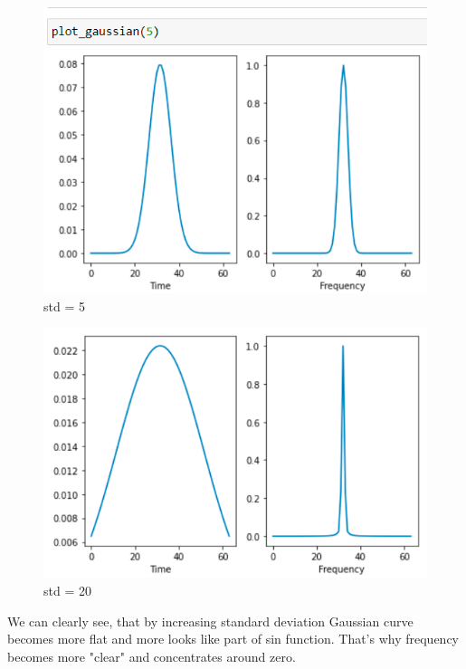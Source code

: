 \documentclass[a4paper]{article}
\begin{document}
        \begin{figure}[H]
            \centering
            \includegraphics[width=\textwidth]{img/p2_3.png}
            \caption{std = 5}
            \label{fig:part1_1_2}
        \end{figure}
        
        \begin{figure}[H]
            \centering
            \includegraphics[width=\textwidth]{img/p2_4.png}
            \caption{std = 20}
            \label{fig:part1_1_2}
        \end{figure}
        
        We can clearly see, that by increasing standard deviation Gaussian curve becomes more flat and more looks like part of sin function. That's why frequency becomes more "clear" and concentrates around zero.
            
\end{document}
